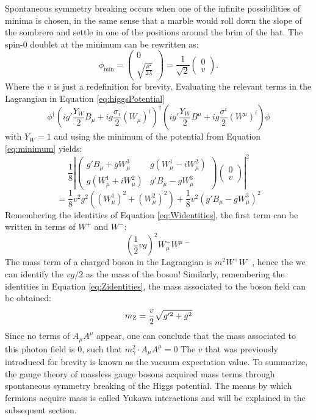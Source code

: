 Spontaneous symmetry breaking occurs when one of the infinite possibilities of minima is chosen, in the same sense that a marble would roll down the slope of the sombrero and settle in one of the positions around the brim of the hat.  
The spin-0 doublet at the minimum can be rewritten as:
\begin{equation}
\phi_{\mathrm{min}}=\begin{pmatrix} 0\\ \sqrt{\frac{\rho^{2}}{2\lambda}}\end{pmatrix}=\frac{1}{\sqrt{2}}\begin{pmatrix} 0\\ v\end{pmatrix}.
\label{eq:minimum}
\end{equation}
Where the $v$ is just a redefinition for brevity. 
Evaluating the relevant terms in the Lagrangian in Equation \ref{eq:higgsPotential} 
\begin{equation}
\phi^{\dagger}\left( ig'\frac{Y_{W}}{2}B_{\mu}+ig\frac{\sigma_{i}}{2}(W_{\mu})^{i}\right)^{\dagger}\left(ig'\frac{Y_{W}}{2}B^{\mu}+ig\frac{\sigma^{i}}{2}(W^{\mu})^{i}\right)\phi
\end{equation}
with $Y_{W}=1$ and using the minimum of the potential from Equation \ref{eq:minimum} yields:
\begin{equation}
\frac{1}{8}\left|\begin{pmatrix} g'B_{\mu}+gW_{\mu}^{3} & g(W_{\mu}^{1}-iW_{\mu}^{2}) \\ g(W_{\mu}^{1}+iW_{\mu}^{2}) & g'B_{\mu}-gW_{\mu}^{3} \end{pmatrix} \begin{pmatrix} 0\\ v\end{pmatrix}\right|^{2}
\end{equation}
\begin{equation}
=\frac{1}{8}v^{2}g^{2}\left((W_{\mu}^{1})^{2} +(W_{\mu}^{2})^{2} \right)+\frac{1}{8}v^{2}(g'B_{\mu}-gW_{\mu}^{3})^{2}
\end{equation}
Remembering the identities of Equation \ref{eq:Widentities}, the first term can be written in terms of $W^{+}$ and $W^{-}$:
\begin{equation}
\left(\frac{1}{2}vg\right)^{2}W_{\mu}^{+}W^{\mu\,-}
\end{equation}
The mass term of a charged boson in the Lagrangian is $m^{2}W^{+}W^{-}$, hence the we can identify the $vg/2$ as the mass of the \PW boson!
Similarly, remembering the identities in Equation \ref{eq:Zidentities}, the mass associated to the \PZ boson field can be obtained:
\begin{equation}
m_{\mathrm{Z}}=\frac{v}{2}\sqrt{g'^{2}+g^{2}}
\end{equation}
Since no terms of $A_{\mu}A^{\mu}$ appear, one can conclude that the mass associated to this photon field is 0, such that $m_{\gamma}^{2}\cdot A_{\mu}A^{\mu}=0$
The $v$ that was previously introduced for brevity is known as the vacuum expectation value. 
To summarize, the gauge theory of massless gauge bosons acquired mass terms through spontaneous symmetry breaking of the Higgs potential.  
The means by which fermions acquire mass is called Yukawa interactions and will be explained in the subsequent section. 
